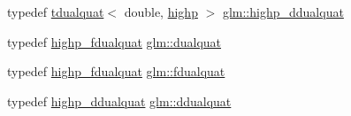 \begin{DoxyCompactItemize}
\item 
typedef \hyperlink{structglm_1_1tdualquat}{tdualquat}$<$ double, \hyperlink{namespaceglm_a36ed105b07c7746804d7fdc7cc90ff25ac6f7eab42eacbb10d59a58e95e362074}{highp} $>$ \hyperlink{group__gtx__dual__quaternion_ga83e4c5d27c8b0a264a3f3aed24f3f84e}{glm\+::highp\+\_\+ddualquat}
\item 
typedef \hyperlink{group__gtx__dual__quaternion_ga8c46d61c38b2b6d9c5091c667dd20fe8}{highp\+\_\+fdualquat} \hyperlink{group__gtx__dual__quaternion_ga2f6227b5f9dc08a2e7682065a84b3aa9}{glm\+::dualquat}
\item 
typedef \hyperlink{group__gtx__dual__quaternion_ga8c46d61c38b2b6d9c5091c667dd20fe8}{highp\+\_\+fdualquat} \hyperlink{group__gtx__dual__quaternion_ga436906129bc69ca5059555cafcbac9fd}{glm\+::fdualquat}
\item 
typedef \hyperlink{group__gtx__dual__quaternion_ga83e4c5d27c8b0a264a3f3aed24f3f84e}{highp\+\_\+ddualquat} \hyperlink{group__gtx__dual__quaternion_ga373431ffdd82d5c03c258217a9e1f1a6}{glm\+::ddualquat}
\end{DoxyCompactItemize}
